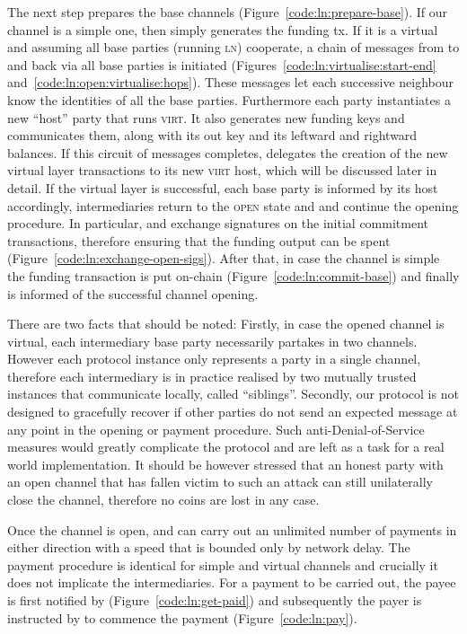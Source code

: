   The next step prepares the base channels (Figure~\ref{code:ln:prepare-base}).
  If our channel is a simple one, then \alice simply generates the funding tx.
  If it is a virtual and assuming all base parties (running \textsc{ln})
  cooperate, a chain of messages from \alice to \bob and back via all base
  parties is initiated (Figures~\ref{code:ln:virtualise:start-end}
  and~\ref{code:ln:open:virtualise:hops}). These messages let each successive
  neighbour know the identities of all the base parties. Furthermore each party
  instantiates a new ``host'' party that runs \textsc{virt}. It also generates
  new funding keys and communicates them, along with its out key and its
  leftward and rightward balances. If this circuit of messages completes, \alice
  delegates the creation of the new virtual layer transactions to its new
  \textsc{virt} host, which will be discussed later in detail. If the virtual
  layer is successful, each base party is informed by its host accordingly,
  intermediaries return to the \textsc{open} state and \alice and \bob continue
  the opening procedure. In particular, \alice and \bob exchange signatures on
  the initial commitment transactions, therefore ensuring that the funding
  output can be spent (Figure~\ref{code:ln:exchange-open-sigs}). After that, in
  case the channel is simple the funding transaction is put on-chain
  (Figure~\ref{code:ln:commit-base}) and finally \environment is informed of the
  successful channel opening.

  There are two facts that should be noted: Firstly, in case the opened channel
  is virtual, each intermediary base party necessarily partakes in two channels.
  However each protocol instance only represents a party in a single channel,
  therefore each intermediary is in practice realised by two mutually trusted
  \pchan instances that communicate locally, called ``siblings''. Secondly, our
  protocol is not designed to gracefully recover if other parties do not send an
  expected message at any point in the opening or payment procedure. Such
  anti-Denial-of-Service measures would greatly complicate the protocol and are
  left as a task for a real world implementation. It should be however stressed
  that an honest party with an open channel that has fallen victim to such an
  attack can still unilaterally close the channel, therefore no coins are lost
  in any case.

  Once the channel is open, \alice and \bob can carry out an unlimited number of
  payments in either direction with a speed that is bounded only by network
  delay. The payment procedure is identical for simple and virtual channels and
  crucially it does not implicate the intermediaries. For a payment to be
  carried out, the payee is first notified by \environment
  (Figure~\ref{code:ln:get-paid}) and subsequently the payer is instructed by
  \environment to commence the payment (Figure~\ref{code:ln:pay}).

